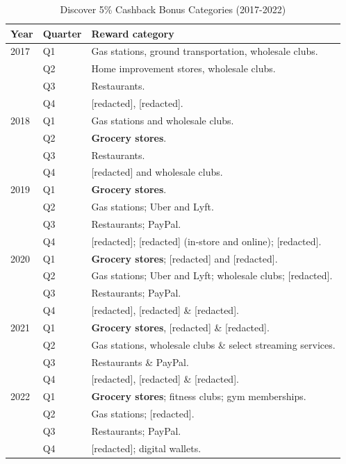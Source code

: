 \documentclass[main.tex]{subfiles}
\begin{document}
\begin{table}
    \centering
    \footnotesize
    \caption{Discover 5\% Cashback Bonus Categories (2017-2022)}
        \vspace{10pt}

    \label{tab:cashback_categories}
    \begin{tabular}{lll}
        \toprule
        Year & Quarter & Reward category \\
        \midrule
        2017 & Q1 & Gas stations, ground transportation, wholesale clubs. \\
                     & Q2 & Home improvement stores, wholesale clubs. \\
                     & Q3 & Restaurants. \\
                     & Q4 & [redacted], [redacted]. \\
        \midrule
        2018 & Q1 & Gas stations and wholesale clubs. \\
        \rowcolor[gray]{0.95}  & Q2 & \textbf{Grocery stores}. \\
                     & Q3 & Restaurants. \\
                     & Q4 & [redacted] and wholesale clubs. \\
        \midrule
        \rowcolor[gray]{0.95} 2019 & Q1 & \textbf{Grocery stores}. \\
                     & Q2 & Gas stations; Uber and Lyft. \\
                     & Q3 & Restaurants; PayPal. \\
                     & Q4 & [redacted]; [redacted] (in-store and online); [redacted]. \\
        \midrule
        \rowcolor[gray]{0.95} 2020 & Q1 & \textbf{Grocery stores}; [redacted] and [redacted]. \\
                     & Q2 & Gas stations; Uber and Lyft; wholesale clubs; [redacted]. \\
                     & Q3 & Restaurants; PayPal. \\
                     & Q4 & [redacted], [redacted] \& [redacted]. \\
        \midrule
        \rowcolor[gray]{0.95} 2021 & Q1 & \textbf{Grocery stores}, [redacted] \& [redacted]. \\
                     & Q2 & Gas stations, wholesale clubs \& select streaming services. \\
                     & Q3 & Restaurants \& PayPal. \\
                     & Q4 & [redacted], [redacted] \& [redacted]. \\
        \midrule
        \rowcolor[gray]{0.95} 2022 & Q1 & \textbf{Grocery stores}; fitness clubs; gym memberships. \\
                     & Q2 & Gas stations; [redacted]. \\
                     & Q3 & Restaurants; PayPal. \\
                     & Q4 & [redacted]; digital wallets. \\
        \bottomrule
    \end{tabular}


\end{table}
\end{document}
